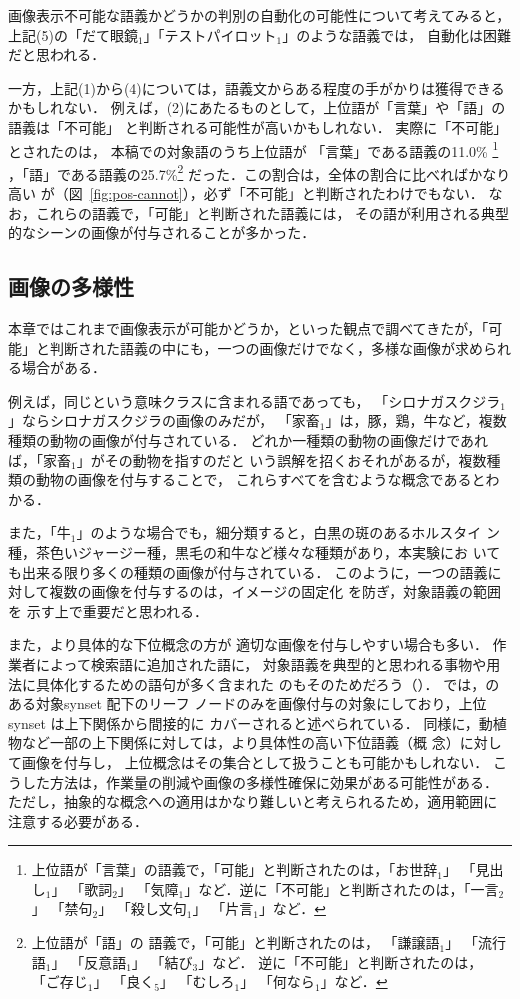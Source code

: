 \documentclass[japanese]{jnlp_1.4}
\newcommand{\izs}[1]{}
\newcommand{\refsec}[1]{}
\newcommand{\WN}{}
\begin{document}
画像表示不可能な語義かどうかの判別の自動化の可能性について考えてみると，
上記(5)の「だて眼鏡$_1$」「テストパイロット$_1$」のような語義では，
自動化は困難だと思われる．

一方，上記(1)から(4)については，語義文からある程度の手がかりは獲得できるかもしれない．
例えば，(2)にあたるものとして，上位語が「言葉」や「語」の語義は「不可能」
と判断される可能性が高いかもしれない．
実際に「不可能」とされたのは，
本稿での対象語のうち上位語が
「言葉」である語義の11.0\%
\footnote{上位語が「言葉」の語義で，「可能」と判断されたのは，「お世辞$_1$」
「見出し$_1$」
「歌詞$_2$」
「気障$_1$」など．逆に「不可能」と判断されたのは，「一言$_2$」
「禁句$_2$」
「殺し文句$_1$」
「片言$_1$」など．}
，「語」である語義の25.7\%\footnote{上位語が「語」の
語義で，「可能」と判断されたのは，
「謙譲語$_1$」
「流行語$_1$」
「反意語$_1$」
「結び$_3$」など．
逆に「不可能」と判断されたのは，
「ご存じ$_1$」
「良く$_5$」
「むしろ$_1$」
「何なら$_1$」など．}
だった．この割合は，全体の割合に比べればかなり高い
が（図~\ref{fig:pos-cannot}），必ず「不可能」と判断されたわけでもない．
なお，これらの語義で，「可能」と判断された語義には，
その語が利用される典型的なシーンの画像が付与されることが多かった．


\subsection{画像の多様性}
\label{sec:disc-diver}

本章ではこれまで画像表示が可能かどうか，といった観点で調べてきたが，「可
能」と判断された語義の中にも，一つの画像だけでなく，多様な画像が求められ
る場合がある．

例えば，同じ\izs{537:獣}という意味クラスに含まれる語であっても，
「シロナガスクジラ$_1$」ならシロナガスクジラの画像のみだが，
「家畜$_1$」は，豚，鶏，牛など，複数種類の動物の画像が付与されている．
どれか一種類の動物の画像だけであれば，「家畜$_1$」がその動物を指すのだと
いう誤解を招くおそれがあるが，複数種類の動物の画像を付与することで，
これらすべてを含むような概念であるとわかる．

また，「牛$_1$」のような場合でも，細分類すると，白黒の斑のあるホルスタイ
ン種，茶色いジャージー種，黒毛の和牛など様々な種類があり，本実験にお
いても出来る限り多くの種類の画像が付与されている．
このように，一つの語義に対して複数の画像を付与するのは，イメージの固定化
を防ぎ\cite{Suwa:Miyabe:Yoshino:2012j}，対象語義の範囲を
示す上で重要だと思われる．

また，より具体的な下位概念の方が
適切な画像を付与しやすい場合も多い．
作業者によって検索語に追加された語に，
対象語義を典型的と思われる事物や用法に具体化するための語句が多く含まれた
のもそのためだろう（\refsec{sec:ana-add-fixed}）．
\cite{Popescu:Millet:etc:2007} では，\WN{}のある対象synset 配下のリーフ
ノードのみを画像付与の対象にしており，上位synset は上下関係から間接的に
カバーされると述べられている．
同様に，動植物など一部の上下関係に対しては，より具体性の高い下位語義（概
念）に対して画像を付与し，
上位概念はその集合として扱うことも可能かもしれない．
こうした方法は，作業量の削減や画像の多様性確保に効果がある可能性がある．
ただし，抽象的な概念への適用はかなり難しいと考えられるため，適用範囲に
注意する必要がある．
\end{document}
